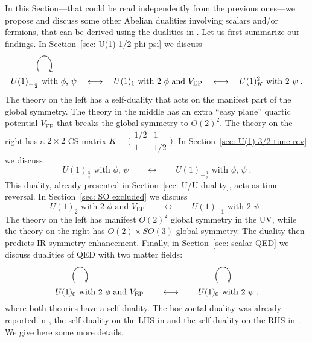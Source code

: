\documentclass[a4paper, 12pt]{article}
\numberwithin{equation}{section}
\newcommand{\smat}[1]{\big( \begin{smallmatrix} #1 \end{smallmatrix} \big)}
\newcommand{\be}{\begin{equation}} \newcommand{\ee}{\end{equation}}
\begin{document}
In this Section---that could be read independently from the previous ones---we propose and discuss some other Abelian dualities involving scalars and/or fermions, that can be derived using the dualities in \cite{Seiberg:2016gmd}. Let us first summarize our findings. In Section~\ref{sec: U(1)-1/2 phi psi} we discuss
\be
\makebox[0pt][l]{\hspace{3em}\raisebox{1.4em}{\begin{tikzpicture} \draw [->,line width=.6pt] (0,0) arc (220:-40:.3 and .4); \end{tikzpicture}}}
U(1)_{-\frac12} \text{ with $\phi$, $\psi$} \quad\longleftrightarrow\quad U(1)_1 \text{ with 2 $\phi$ and $V_\text{EP}$} \quad\longleftrightarrow\quad U(1)^2_K \text{ with 2 $\psi$} \;.
\ee
The theory on the left has a self-duality that acts on the manifest part of the global symmetry. The theory in the middle has an extra ``easy plane'' quartic potential $V_\text{EP}$ that breaks the global symmetry to $O(2)^2$. The theory on the right has a $2\times2$ CS matrix $K = \smat{1/2 & 1 \\ 1 & 1/2}$. In Section~\ref{sec: U(1) 3/2 time rev} we discuss
\be
U(1)_\frac32 \text{ with $\phi$, $\psi$} \qquad\longleftrightarrow\qquad U(1)_{-\frac32} \text{ with $\phi$, $\psi$} \;.
\ee
This duality, already presented in Section~\ref{sec: U/U duality}, acts as time-reversal. In Section~\ref{sec: SO excluded} we discuss
\be
U(1)_2 \text{ with 2 $\phi$ and $V_\text{EP}$} \qquad\longleftrightarrow\qquad U(1)_{-1} \text{ with 2 $\psi$} \;.
\ee
The theory on the left has manifest $O(2)^2$ global symmetry in the UV, while the theory on the right has $O(2)\times SO(3)$ global symmetry. The duality then predicts IR symmetry enhancement. Finally, in Section~\ref{sec: scalar QED} we discuss dualities of QED with two matter fields:
\be
\makebox[0pt][l]{\hspace{2em}\raisebox{1.4em}{\begin{tikzpicture} \draw [->,line width=.6pt] (0,0) arc (220:-40:.3 and .4); \end{tikzpicture}}}
U(1)_0 \text{ with 2 $\phi$ and $V_\text{EP}$} \qquad\longleftrightarrow\qquad
\makebox[0pt][l]{\hspace{2em}\raisebox{1.4em}{\begin{tikzpicture} \draw [->,line width=.6pt] (0,0) arc (220:-40:.3 and .4); \end{tikzpicture}}}
U(1)_0 \text{ with 2 $\psi$} \;,
\ee
where both theories have a self-duality. The horizontal duality was already reported in \cite{Motrunich:2003fz, Karch:2016sxi}, the self-duality on the LHS in \cite{Wang:2017txt} and the self-duality on the RHS in \cite{Xu:2015lxa, Hsin:2016blu, Benini:2017dus}. We give here some more details.
\end{document}
